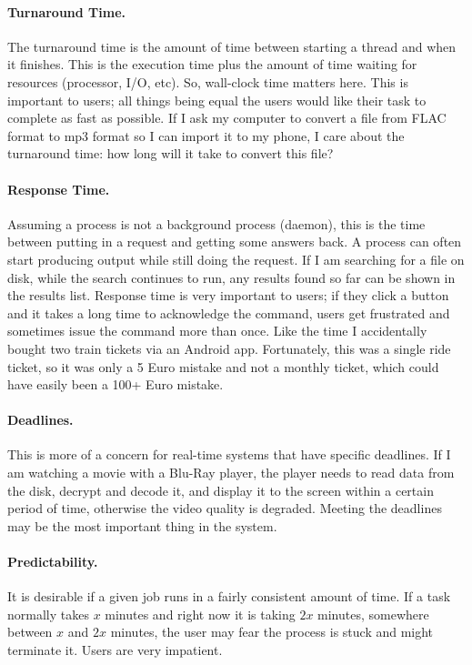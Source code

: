 \paragraph{Turnaround Time.} The turnaround time is the amount of time between starting a thread and when it finishes. This is the execution time plus the amount of time waiting for resources (processor, I/O, etc). So, wall-clock time matters here. This is important to users; all things being equal the users would like their task to complete as fast as possible. If I ask my computer to convert a file from FLAC format to mp3 format so I can import it to my phone, I care about the turnaround time: how long will it take to convert this file?

\paragraph{Response Time.} Assuming a process is not a background process (daemon), this is the time between putting in a request and getting some answers back. A process can often start producing output while still doing the request. If I am searching for a file on disk, while the search continues to run, any results found so far can be shown in the results list. Response time is very important to users; if they click a button and it takes a long time to acknowledge the command, users get frustrated and sometimes issue the command more than once. Like the time I accidentally bought two train tickets via an Android app. Fortunately, this was a single ride ticket, so it was only a 5 Euro mistake and not a monthly ticket, which could have easily been a 100+ Euro mistake.

\paragraph{Deadlines.} This is more of a concern for real-time systems that have specific deadlines. If I am watching a movie with a Blu-Ray player, the player needs to read data from the disk, decrypt and decode it, and display it to the screen within a certain period of time, otherwise the video quality is degraded. Meeting the deadlines may be the most important thing in the system.

\paragraph{Predictability.} It is desirable if a given job runs in a fairly consistent amount of time. If a task normally takes $x$ minutes and right now it is taking $2x$ minutes, somewhere between $x$ and $2x$ minutes, the user may fear the process is stuck and might terminate it. Users are very impatient.

